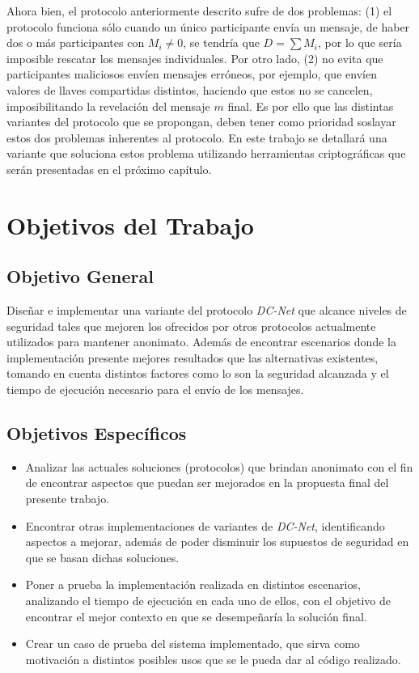Ahora bien, el protocolo anteriormente descrito sufre de dos problemas: (1) el protocolo funciona sólo cuando un 
único participante envía un mensaje, de haber dos o más participantes con $M_i \neq 0$, se tendría que $D = \sum M_i$, por lo que sería imposible 
rescatar los mensajes individuales. Por otro lado, (2) no evita que participantes maliciosos envíen mensajes erróneos, por ejemplo, que envíen 
valores de llaves compartidas distintos, haciendo que estos no se cancelen, imposibilitando la revelación del mensaje $m$ final. Es por ello que 
las distintas variantes del protocolo que se propongan, deben tener como prioridad soslayar estos dos problemas inherentes al protocolo. En este 
trabajo se detallará una variante que soluciona estos problema utilizando herramientas criptográficas que serán presentadas en el próximo capítulo.

\section{Objetivos del Trabajo}

\subsection{Objetivo General}

Diseñar e implementar una variante del protocolo \emph{DC-Net} que alcance niveles de seguridad tales que mejoren los ofrecidos por otros protocolos 
actualmente utilizados para mantener anonimato. Además de encontrar escenarios donde la implementación presente mejores resultados que las 
alternativas existentes, tomando en cuenta distintos factores como lo son la seguridad alcanzada y el tiempo de ejecución necesario para el envío de los mensajes.

\subsection{Objetivos Específicos}

\begin{itemize}
    \item Analizar las actuales soluciones (protocolos) que brindan anonimato con el fin de encontrar aspectos que puedan ser mejorados en la propuesta 
    final del presente trabajo.
    \item Encontrar otras implementaciones de variantes de \emph{DC-Net}, identificando aspectos a mejorar, además de poder disminuir los supuestos de 
    seguridad en que se basan dichas soluciones.
    \item Poner a prueba la implementación realizada en distintos escenarios, analizando el tiempo de ejecución en cada uno de ellos, con el objetivo 
    de encontrar el mejor contexto en que se desempeñaría la solución final.
    \item Crear un caso de prueba del sistema implementado, que sirva como motivación a distintos posibles usos que se le pueda dar al código realizado.
\end{itemize}

